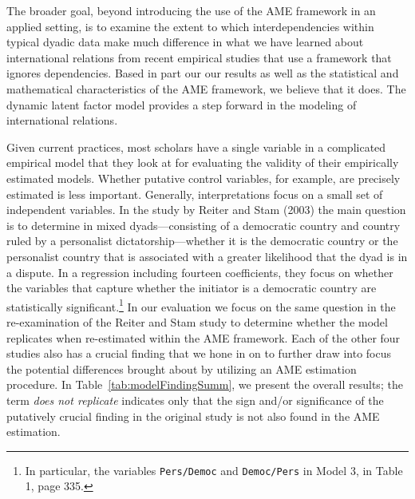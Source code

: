The broader goal, beyond introducing the use of the AME framework in an applied setting, is to examine the extent to which interdependencies within typical dyadic data make much difference in what we have learned about international relations from recent empirical studies that use a framework that ignores dependencies.  Based in part our our results as well as the statistical and mathematical characteristics of the AME framework, we believe that it does. The dynamic latent factor model provides a step forward in the modeling of international relations.

Given current practices, most scholars have a single variable in a complicated empirical model that they look at for evaluating the validity of their empirically estimated models.  Whether putative control variables, for example, are precisely estimated is less important. Generally, interpretations focus on a small set of independent variables.  In the study by Reiter and Stam (2003) the main question is to determine in mixed dyads---consisting of a democratic country and country ruled by a personalist dictatorship---whether it is the democratic country or the personalist country that is associated with a greater likelihood that the dyad is in a dispute.  In a regression including fourteen coefficients, they focus on whether the variables that capture whether the initiator is a democratic country are statistically significant.\footnote{In particular, the variables \texttt{Pers/Democ} and \texttt{Democ/Pers} in Model 3, in Table 1, page 335.} In our evaluation we focus on the same question in the re-examination of the Reiter and Stam study to determine whether the model replicates when re-estimated within the AME framework. Each of the other four studies also has a crucial finding that we hone in on to further draw into focus the potential differences brought about by utilizing an AME estimation procedure.  In Table~\ref{tab:modelFindingSumm}, we present the overall results; the term \textit{does not replicate} indicates only that the sign and/or significance of the putatively crucial finding in the original study is not also found in the AME estimation.

